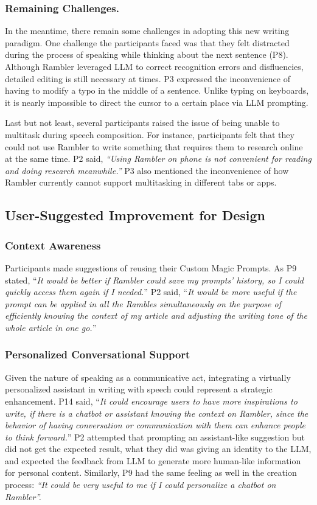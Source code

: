 \subsubsection{Remaining Challenges.}
In the meantime, there remain some challenges in adopting this new writing paradigm.
One challenge the participants faced was that they felt distracted during the process of speaking while thinking about the next sentence (P8). 
Although Rambler leveraged LLM to correct recognition errors and disfluencies, detailed editing is still necessary at times.
P3 expressed the inconvenience of having to modify a typo in the middle of a sentence. Unlike typing on keyboards, it is nearly impossible to direct the cursor to a certain place via LLM prompting.

Last but not least, several participants raised the issue of being unable to multitask during speech composition. For instance, participants felt that they could not use Rambler to write something that requires them to research online at the same time. P2 said, \textit{``Using Rambler on phone is not convenient for reading and doing research meanwhile.''}
P3 also mentioned the inconvenience of how Rambler currently cannot support multitasking in different tabs or apps.

\subsection{User-Suggested Improvement for Design}
\subsubsection{Context Awareness} Participants made suggestions of reusing their Custom Magic Prompts. As P9 stated, ``\textit{It would be better if Rambler could save my prompts' history, so I could quickly access them again if I needed.}'' P2 said, ``\textit{It would be more useful if the prompt can be applied in all the Rambles simultaneously on the purpose of efficiently knowing the context of my article and adjusting the writing tone of the whole article in one go.}''

\subsubsection{Personalized Conversational Support} Given the nature of speaking as a communicative act, integrating a virtually personalized assistant in writing with speech could represent a strategic enhancement. P14 said, ``\textit{It could encourage users to have more inspirations to write, if there is a chatbot or assistant knowing the context on Rambler, since the behavior of having conversation or communication with them can enhance people to think forward.}''
P2 attempted that prompting an assistant-like suggestion but did not get the expected result, what they did was giving an identity to the LLM, and expected the feedback from LLM to generate more human-like information for personal content. Similarly, P9 had the same feeling as well in the creation process: \textit{“It could be very useful to me if I could personalize a chatbot on Rambler”.}

